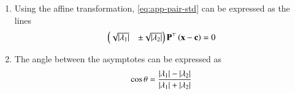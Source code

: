 \begin{enumerate}[label=\thesubsection.\arabic*.,ref=\thesubsection.\theenumi]
  \begin{proof}
Let 
  \begin{align} 
	  \myvec{\vec{V} & \vec{u}\\ \vec{u}^{\top} & f}  \vec{x} =\vec{0}
  \end{align} 
  Expressing 
  \begin{align} 
	  \vec{x} =\myvec{\vec{y} \\ y_3}, 
  \end{align} 
  \begin{align} 
	  \myvec{\vec{V} & \vec{u}\\ \vec{u}^{\top} & f}   
	  \myvec{\vec{y} \\ y_3} &= \vec{0}
	  \\
	  \implies
	  \label{eq:pair-mat-sing-1}
	  \vec{V} \vec{y} + y_3\vec{u} &= \vec{0} \quad \text{and}
	  \\
	  \vec{u}^{\top}\vec{y} + fy_3 &=0
	  \label{eq:pair-mat-sing-2}
  \end{align} 
  From 
	  \eqref{eq:pair-mat-sing-1} we obtain,
  \begin{align} 
	  \vec{y}^{\top}  \vec{V} \vec{y} + y_3\vec{y}^{\top}\vec{u} &= \vec{0} 
	  \\
	  \implies 
	  \vec{y}^{\top}  \vec{V} \vec{y} + y_3\vec{u}^{\top}\vec{y} &= \vec{0} 
  \end{align} 
  yielding 
	  \eqref{eq:pair-cond} upon substituting from 
	  \eqref{eq:pair-mat-sing-2}.
  \end{proof}
  \item
	  Using the affine transformation, 
    \eqref{eq:app-pair-std}
 can be expressed as the lines 
%
\begin{align} 
\label{eq:quad_form_pair}
\begin{pmatrix}\sqrt{\left\vert\lambda_1\right\vert} & \pm \sqrt{\left\vert\lambda_2\right\vert}\end{pmatrix}\mathbf{P}^{\top}\left(\mathbf{x}-\mathbf{c}\right) = 0
\end{align} 
  
   \item
	   The angle between the asymptotes can be expressed as
\begin{align} 
\label{eq:app-quad_form_pair_ang}
\cos\theta=\frac{\left\vert\lambda_1\right\vert-\left\vert\lambda_2\right\vert}
{\left\vert\lambda_1\right\vert+\left\vert\lambda_2\right\vert}
\end{align} 
  

\end{enumerate}
